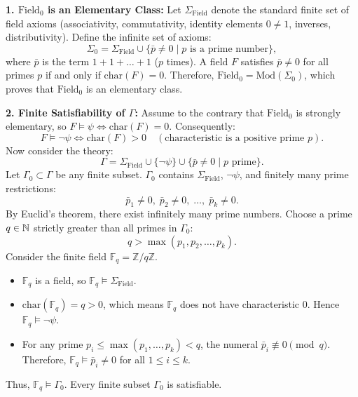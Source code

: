 \begin{tabletworkspace}[5.0cm]
\end{tabletworkspace}

\begin{solution}
\textbf{1. $\mathrm{Field}_0$ is an Elementary Class:}
Let $\Sigma_{\mathrm{Field}}$ denote the standard finite set of field axioms (associativity, commutativity, identity elements $0 \ne 1$, inverses, distributivity).
Define the infinite set of axioms:
\[
\Sigma_0 = \Sigma_{\mathrm{Field}} \cup \{ \bar{p} \ne 0 \mid p \text{ is a prime number} \},
\]
where $\bar{p}$ is the term $1 + 1 + \dots + 1$ ($p$ times).
A field $F$ satisfies $\bar{p} \ne 0$ for all primes $p$ if and only if $\mathrm{char}(F) = 0$.
Therefore, $\mathrm{Field}_0 = \mathrm{Mod}(\Sigma_0)$, which proves that $\mathrm{Field}_0$ is an elementary class.

\textbf{2. Finite Satisfiability of $\Gamma$:}
Assume to the contrary that $\mathrm{Field}_0$ is strongly elementary, so $F \models \psi \iff \mathrm{char}(F) = 0$.
Consequently:
\[
F \models \neg \psi \iff \mathrm{char}(F) > 0 \quad (\text{characteristic is a positive prime } p).
\]
Now consider the theory:
\[
\Gamma = \Sigma_{\mathrm{Field}} \cup \{\neg \psi\} \cup \{ \bar{p} \ne 0 \mid p \text{ prime} \}.
\]
Let $\Gamma_0 \subset \Gamma$ be any finite subset.
$\Gamma_0$ contains $\Sigma_{\mathrm{Field}}$, $\neg \psi$, and finitely many prime restrictions:
\[
\bar{p}_1 \ne 0, \;\bar{p}_2 \ne 0, \;\dots, \;\bar{p}_k \ne 0.
\]
By Euclid's theorem, there exist infinitely many prime numbers.
Choose a prime $q \in \mathbb{N}$ strictly greater than all primes in $\Gamma_0$:
\[
q > \max(p_1, p_2, \dots, p_k).
\]
Consider the finite field $\mathbb{F}_q = \mathbb{Z} / q\mathbb{Z}$.
\begin{itemize}[leftmargin=1.4em,itemsep=2pt]
  \item $\mathbb{F}_q$ is a field, so $\mathbb{F}_q \models \Sigma_{\mathrm{Field}}$.
  \item $\mathrm{char}(\mathbb{F}_q) = q > 0$, which means $\mathbb{F}_q$ does not have characteristic 0. Hence $\mathbb{F}_q \models \neg \psi$.
  \item For any prime $p_i \le \max(p_1, \dots, p_k) < q$, the numeral $\bar{p}_i \not\equiv 0 \pmod q$.
  Therefore, $\mathbb{F}_q \models \bar{p}_i \ne 0$ for all $1 \le i \le k$.
\end{itemize}
Thus, $\mathbb{F}_q \models \Gamma_0$. Every finite subset $\Gamma_0$ is satisfiable.


\end{solution}

